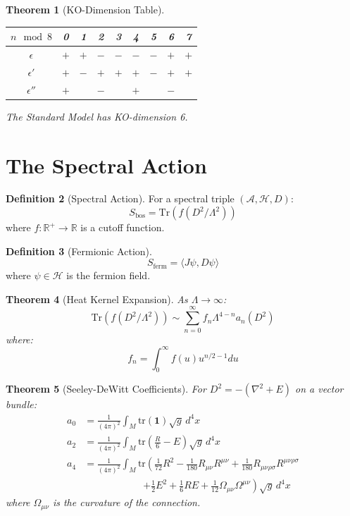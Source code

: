 \documentclass[11pt,a4paper,openright]{book}
\theoremstyle{plain}
\newtheorem{theorem}{Theorem}[chapter]
\theoremstyle{definition}
\newtheorem{definition}[theorem]{Definition}
\newcommand{\Hil}{\mathcal{H}}
\newcommand{\A}{\mathcal{A}}
\newcommand{\Tr}{\mathrm{Tr}}
\newcommand{\tr}{\mathrm{tr}}
\newcommand{\R}{\mathbb{R}}
\begin{document}
\begin{theorem}[KO-Dimension Table]
\begin{center}
\begin{tabular}{c|cccccccc}
$n \mod 8$ & 0 & 1 & 2 & 3 & 4 & 5 & 6 & 7 \\
\hline
$\epsilon$ & $+$ & $+$ & $-$ & $-$ & $-$ & $-$ & $+$ & $+$ \\
$\epsilon'$ & $+$ & $-$ & $+$ & $+$ & $+$ & $-$ & $+$ & $+$ \\
$\epsilon''$ & $+$ & & $-$ & & $+$ & & $-$ & \\
\end{tabular}
\end{center}
The Standard Model has KO-dimension 6.
\end{theorem}

\section{The Spectral Action}

\begin{definition}[Spectral Action]
For a spectral triple $(\A, \Hil, D)$:
\begin{equation}
S_{\text{bos}} = \Tr(f(D^2/\Lambda^2))
\end{equation}
where $f: \R^+ \to \R$ is a cutoff function.
\end{definition}

\begin{definition}[Fermionic Action]
\begin{equation}
S_{\text{ferm}} = \langle J\psi, D\psi \rangle
\end{equation}
where $\psi \in \Hil$ is the fermion field.
\end{definition}

\begin{theorem}[Heat Kernel Expansion]
As $\Lambda \to \infty$:
\begin{equation}
\Tr(f(D^2/\Lambda^2)) \sim \sum_{n=0}^\infty f_n \Lambda^{4-n} a_n(D^2)
\end{equation}
where:
\begin{equation}
f_n = \int_0^\infty f(u) u^{n/2 - 1} du
\end{equation}
\end{theorem}

\begin{theorem}[Seeley-DeWitt Coefficients]
For $D^2 = -(\nabla^2 + E)$ on a vector bundle:
\begin{align}
a_0 &= \frac{1}{(4\pi)^2} \int_M \tr(\mathbf{1}) \sqrt{g} \, d^4x \\
a_2 &= \frac{1}{(4\pi)^2} \int_M \tr\left(\frac{R}{6} - E\right) \sqrt{g} \, d^4x \\
a_4 &= \frac{1}{(4\pi)^2} \int_M \tr\left(\frac{1}{72}R^2 - \frac{1}{180}R_{\mu\nu}R^{\mu\nu} + \frac{1}{180}R_{\mu\nu\rho\sigma}R^{\mu\nu\rho\sigma}\right. \\
&\qquad\qquad\qquad \left. + \frac{1}{2}E^2 + \frac{1}{6}RE + \frac{1}{12}\Omega_{\mu\nu}\Omega^{\mu\nu}\right) \sqrt{g} \, d^4x
\end{align}
where $\Omega_{\mu\nu}$ is the curvature of the connection.
\end{theorem}
\end{document}
